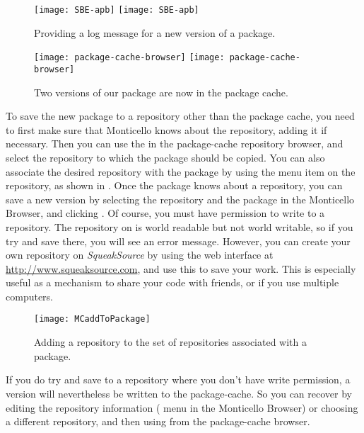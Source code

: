 \documentclass[a4paper,10pt,twoside]{book}
\begin{document}
\begin{figure}[tbp]
	\begin{center}
	\ifluluelse
		{\texttt{[image: SBE-apb]}}
		{\texttt{[image: SBE-apb]}}
	\end{center}
	\caption{Providing a log message for a new version of a package.}
	\label{fig:SBE-apb}
\end{figure}

\begin{figure}[tbp]
	\begin{center}
	\ifluluelse
		{\texttt{[image: package-cache-browser]}}
		{\texttt{[image: package-cache-browser]}}
	\end{center}
	\caption{Two versions of our package are now in the package cache.}
	\label{fig:package-cache-browser}
\end{figure}

To save the new package to a repository other than the package cache, you need to first make sure that Monticello knows about the repository, adding it if necessary.  
Then you can use the  in the package-cache repository browser, and select the repository to which the package should be copied.  
You can also associate the desired repository with the package by using the  menu item  on the repository, as shown in .  
Once the package knows about a repository, you can save a new version by selecting the repository and the package in the Monticello Browser, and clicking .  
Of course, you must have permission to write to a repository.  
The  repository on  is world readable but not world writable, so if you try and save there, you will see an error message.  
However, you can create your own repository on \emph{SqueakSource} by using the web interface at \url{http://www.squeaksource.com}, and use this to save your work. 
This is especially useful as a mechanism to share your code with friends, or if you use multiple computers.

\begin{figure}[tbp]
	\begin{center}
		\texttt{[image: MCaddToPackage]}
	\end{center}
	\caption{Adding a repository to the set of repositories associated with a package.}
	\label{fig:associateRepository}
\end{figure}

If you do try and save to a repository where you don't have write permission, a version will nevertheless be written to the package-cache.  
So you can recover by editing the repository information ( menu in the Monticello Browser) or choosing a different repository, and then using  from the package-cache browser.
\end{document}
